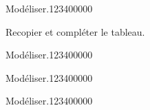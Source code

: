 \begin{pageAD} 
 

 
  
\begin{ExoCad}{Modéliser.}{1234}{0}{0}{0}{0}{0}

Recopier et compléter le tableau.

 
\end{ExoCad}


\begin{ExoCad}{Modéliser.}{1234}{0}{0}{0}{0}{0}

 
 
\end{ExoCad}

\begin{ExoCad}{Modéliser.}{1234}{0}{0}{0}{0}{0}

 
 
\end{ExoCad}


\begin{ExoCad}{Modéliser.}{1234}{0}{0}{0}{0}{0}


\end{ExoCad}
\end{pageAD}
